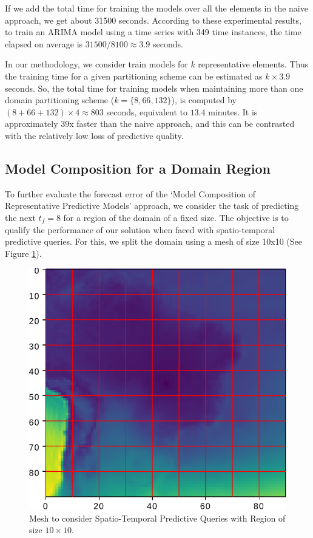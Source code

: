 If we add the total time for training the models over all the elements in the naive approach, we get about 31500 seconds. According to these experimental results, to train an ARIMA model using a time series with 349 time instances, the time elapsed on average is $31500 / 8100 \approx 3.9$ seconds. 

In our methodology, we consider train models for $k$ representative elements. Thus the training time for a given partitioning scheme can be estimated as $k \times 3.9$ seconds. So, the total time for training models when maintaining more than one domain partitioning scheme ($k = \{8, 66, 132\}$), is computed by $(8 + 66  + 132) \times 4 \approx 803$ seconds, equivalent to $13.4$ minutes. It is approximately $39$x faster than the naive approach, and this can be contrasted with the relatively low loss of predictive quality.

\subsection{Model Composition for a Domain Region}
\label{Sec:ModelCompositionAggregated}

To further evaluate the forecast error of the `Model Composition of Representative Predictive Models’ approach, we consider the task of predicting the next $t_{f}=8$ for a region of the domain of a fixed size. The objective is to qualify the performance of our solution when faced with spatio-temporal predictive queries. For this, we split the domain using a mesh of size 10x10 (See Figure \ref{Fig:Query_10x10_whole_real_brazil}).

\begin{figure}[h]
	\centering
	\includegraphics[scale=0.75]{../Figures/query_10x10_whole_real_brazil}
	\caption{Mesh to consider Spatio-Temporal Predictive Queries with Region of size $10 \times 10$.}
	\label{Fig:Query_10x10_whole_real_brazil}
\end{figure}

